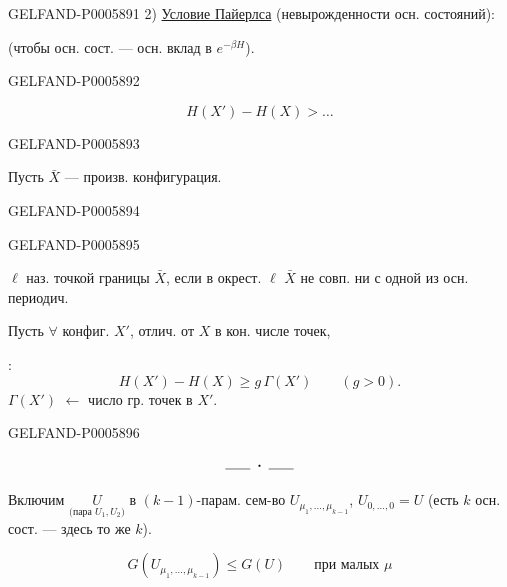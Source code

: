 \begin{GelfandAdjacentEvidence}{GELFAND-P000589}{1}
2) \underline{Условие Пайерлса} (невырожденности осн. состояний):

(чтобы осн. сост. — осн. вклад в \(e^{-\beta H}\)).
\end{GelfandAdjacentEvidence}
\begin{GelfandAdjacentEvidence}{GELFAND-P000589}{2}

\[
H(X')-H(X)>\ldots
\]
\end{GelfandAdjacentEvidence}
\begin{GelfandAdjacentEvidence}{GELFAND-P000589}{3}

Пусть \(\bar X\) — произв. конфигурация.
\end{GelfandAdjacentEvidence}
\begin{GelfandAdjacentEvidence}{GELFAND-P000589}{4}

\end{GelfandAdjacentEvidence}
\begin{GelfandAdjacentEvidence}{GELFAND-P000589}{5}

\(\ell\) наз. точкой границы \(\bar X\), если в окрест. \(\ell\)
\(\bar X\) не совп. ни с одной из осн. периодич.

Пусть \(\forall\) конфиг. \(X'\), отлич. от \(X\) в кон. числе точек,

:
\[
H(X')-H(X)\ge g\,\Gamma(X')\qquad(g>0).
\]
\(\Gamma(X')\) \(\longleftarrow\) число гр. точек в \(X'\).
\end{GelfandAdjacentEvidence}
\begin{GelfandAdjacentEvidence}{GELFAND-P000589}{6}


\[
\rule{1.8em}{.4pt}\;\boldsymbol{\cdot}\;\rule{1.8em}{.4pt}
\]

Включим \(\underset{\text{(пара $U_1,U_2$)}}{U}\)
в \((k-1)\)-парам. сем-во
\(U_{\mu_1,\ldots,\mu_{k-1}}\), \(U_{0,\ldots,0}=U\)
(есть \(k\) осн. сост. — здесь то же \(k\)).

\[
G(U_{\mu_1,\ldots,\mu_{k-1}})\le G(U)\qquad \text{при малых }\mu
\]
\end{GelfandAdjacentEvidence}
